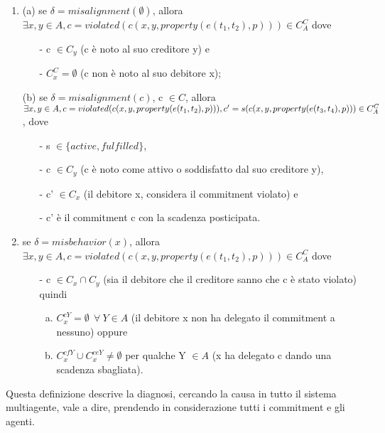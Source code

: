 \documentclass[a4paper,12pt]{report}
\begin{document}
\begin{enumerate}
    \item (a) se $\delta=misalignment(\emptyset)$, allora\\
    $\exists x,y\in A, c=violated(c(x,y,property(e(t_1,t_2),p)))\in C^{C}_{A}$ dove
    \begin{enumerate}
        \item[-] c $\in C_y$ (c è noto al suo creditore y) e
        \item[-] $C^{C}_{x}=\emptyset$ (c non è noto al suo debitore x);
    \end{enumerate}
    (b) se $\delta=misalignment(c)$, c $\in C$, allora\\
    $\exists x,y\in A, c=violated(c(x,y,property(e(t_1,t_2),p))),\\
    c'=s(c(x,y,property(e(t_3,t_4),p)))\in C^{C}_{A}$, dove
    \begin{enumerate}
        \item[-] s $\in \{active,fulfilled\}$,
        \item[-] c $\in C_y$ (c è noto come attivo o soddisfatto dal suo creditore y),
        \item[-] c' $\in C_x$ (il debitore x, considera il commitment violato) e
        \item[-] c' è il commitment c con la scadenza posticipata.
    \end{enumerate}
    \item se $\delta=misbehavior(x)$, allora\\
    $\exists x,y\in A, c=violated(c(x,y,property(e(t_1,t_2),p)))\in C^{C}_{A}$ dove
    \begin{enumerate}
        \item[-] c $\in C_x\cap C_y$ (sia il debitore che il creditore sanno che c è stato violato) quindi
        \begin{enumerate}[(a)]
            \item $C^{cY}_{x}=\emptyset\ \ \forall\ Y \in A$ (il debitore x non ha delegato il commitment a nessuno) oppure
            \item $C^{cfY}_{x} \cup C^{ceY}_{x}\ne \emptyset$ per qualche Y $\in A$ (x ha delegato c dando una scadenza sbagliata).
        \end{enumerate}
    \end{enumerate}
\end{enumerate}
Questa definizione descrive la diagnosi, cercando la causa in tutto il sistema multiagente, vale a dire, prendendo in considerazione tutti i commitment e gli agenti.
\newpage
\end{document}

